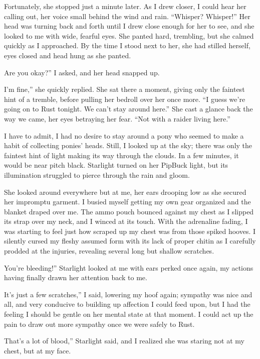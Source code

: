 Fortunately, she stopped just a minute later. As I drew closer, I could hear her calling out, her voice small behind the wind and rain. “Whisper? Whisper!” Her head was turning back and forth until I drew close enough for her to see, and she looked to me with wide, fearful eyes. She panted hard, trembling, but she calmed quickly as I approached. By the time I stood next to her, she had stilled herself, eyes closed and head hung as she panted.

\leavevmode{}Are you okay?” I asked, and her head snapped up.

\leavevmode{}I’m fine,” she quickly replied. She sat there a moment, giving only the faintest hint of a tremble, before pulling her bedroll over her once more. “I guess we’re going on to Rust tonight. We can’t stay around here.” She cast a glance back the way we came, her eyes betraying her fear. “Not with a raider living here.”

I have to admit, I had no desire to stay around a pony who seemed to make a habit of collecting ponies’ heads. Still, I looked up at the sky; there was only the faintest hint of light making its way through the clouds. In a few minutes, it would be near pitch black. Starlight turned on her PipBuck light, but its illumination struggled to pierce through the rain and gloom.

She looked around everywhere but at me, her ears drooping low as she secured her impromptu garment. I busied myself getting my own gear organized and the blanket draped over me. The ammo pouch bounced against my chest as I slipped its strap over my neck, and I winced at its touch. With the adrenaline fading, I was starting to feel just how scraped up my chest was from those spiked hooves. I silently cursed my fleshy assumed form with its lack of proper chitin as I carefully prodded at the injuries, revealing several long but shallow scratches.

\leavevmode{}You’re bleeding!” Starlight looked at me with ears perked once again, my actions having finally drawn her attention back to me.

\leavevmode{}It’s just a few scratches,” I said, lowering my hoof again; sympathy was nice and all, and very conducive to building up affection I could feed upon, but I had the feeling I should be gentle on her mental state at that moment. I could act up the pain to draw out more sympathy once we were safely to Rust.

\leavevmode{}That’s a lot of blood,” Starlight said, and I realized she was staring not at my chest, but at my face.

